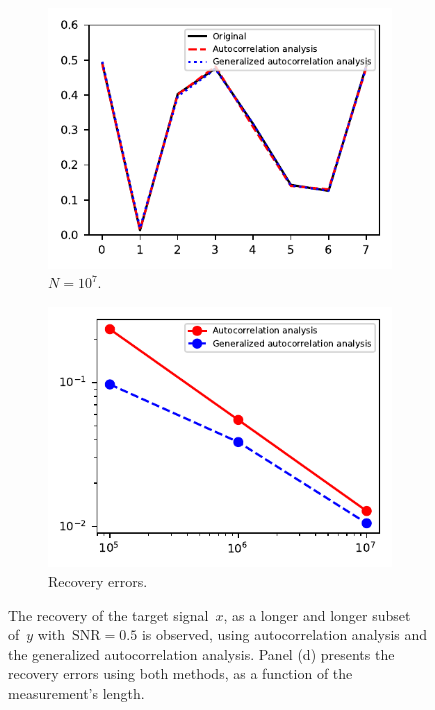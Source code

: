 \documentclass{article}
\begin{document}
\begin{figure}[!tb]
\begin{subfigure}[ht]{0.245\textwidth}
		\includegraphics[width=\columnwidth]{figures/recovery_3.pdf}
		\caption{$N = 10^7$.}
	\end{subfigure}
	\hfill
	\begin{subfigure}[ht]{0.245\textwidth}
		\centering
		\includegraphics[width=\columnwidth]{figures/recovery_errs.pdf}
		\caption{Recovery errors.}
	\end{subfigure}
	\caption{The recovery of the target signal~$x$, as a longer and longer subset of~$y$ with~\mbox{$\text{SNR} = 0.5$} is observed, using autocorrelation analysis and the generalized autocorrelation analysis. Panel (d) presents the recovery errors using both methods, as a function of the measurement's length.}
\label{fig:recoveries}
\end{figure}
\end{document}
